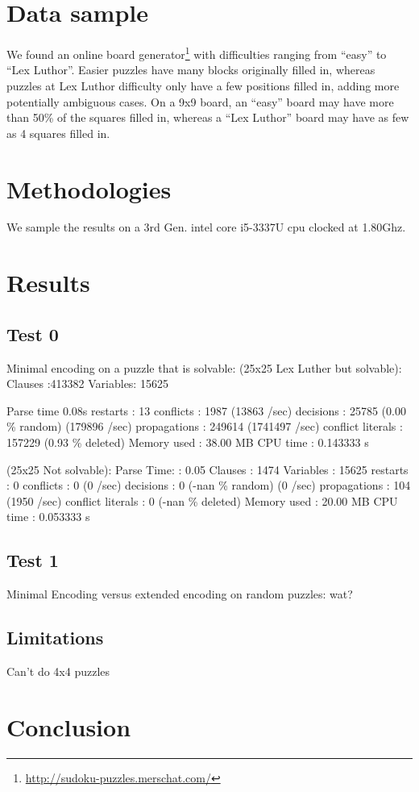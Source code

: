 \documentclass[conference,final]{IEEEtran}
\begin{document}
\section{Data sample}
We found an online board
generator\footnote{\url{http://sudoku-puzzles.merschat.com/}} with difficulties
ranging from ``easy'' to ``Lex Luthor''. Easier puzzles have many blocks
originally filled in, whereas puzzles at Lex Luthor difficulty only have a few
positions filled in, adding more potentially ambiguous cases. On a 9x9 board,
an ``easy'' board may have more than 50\% of the squares filled in, whereas a
``Lex Luthor'' board may have as few as 4 squares filled in.

\section{Methodologies}
We sample the results on a 3rd Gen. intel core i5-3337U cpu clocked at 1.80Ghz.

\section{Results}

\subsection{Test 0}
Minimal encoding on a puzzle that is solvable:
(25x25 Lex Luther but solvable):
Clauses  :413382
Variables: 15625

Parse time 0.08s
restarts              : 13
conflicts             : 1987           (13863 /sec)
decisions             : 25785          (0.00 \% random) (179896 /sec)
propagations          : 249614         (1741497 /sec)
conflict literals     : 157229         (0.93 \% deleted)
Memory used           : 38.00 MB
CPU time              : 0.143333 s

(25x25 Not solvable):
Parse Time:		: 0.05
Clauses		      : 1474 
Variables	      : 15625
restarts              : 0
conflicts             : 0              (0 /sec)
decisions             : 0              (-nan \% random) (0 /sec)
propagations          : 104            (1950 /sec)
conflict literals     : 0              (-nan \% deleted)
Memory used           : 20.00 MB
CPU time              : 0.053333 s

\subsection{Test 1}
Minimal Encoding versus extended encoding on random puzzles:
wat?








\subsection{Limitations}
Can't do 4x4 puzzles

\section{Conclusion}
\end{document}
